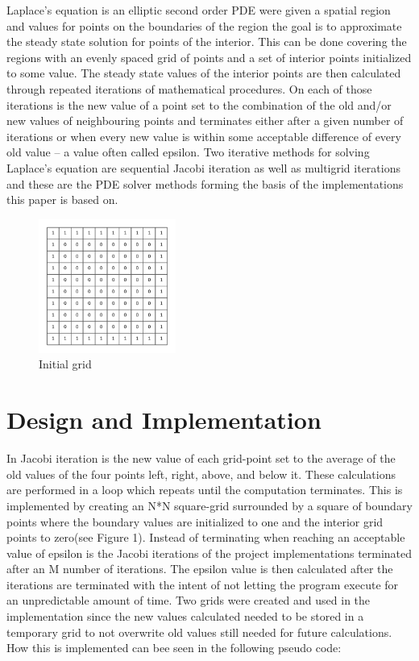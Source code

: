 \documentclass{article}
\begin{document}
Laplace’s equation is an elliptic second order PDE were given a spatial region and values for points on the boundaries of the region the goal is to approximate the steady state solution for points of the interior. This can be done covering the regions with an evenly spaced grid of points and a set of interior points initialized to some value. The steady state values of the interior points are then calculated through repeated iterations of mathematical procedures. On each of those iterations is the new value of a point set to the combination of the old and/or new values of neighbouring points and terminates either after a given number of iterations or when every new value is within some acceptable difference of every old value – a value often called epsilon. Two iterative methods for solving Laplace’s equation are sequential Jacobi iteration as well as multigrid iterations and these are the PDE solver methods forming the basis of the implementations this paper is based on. 

\begin{figure}
    \includegraphics[width=0.4\textwidth]{../images/grid.png}
    \caption{Initial grid}
    \label{grid}
\end{figure}
\newpage


\section{Design and Implementation}\label{programs}

In Jacobi iteration is the new value of each grid-point set to the average of the old values of the four points left, right, above, and below it. These calculations are performed in a loop which repeats until the computation terminates. This is implemented by creating an N*N square-grid surrounded by a square of boundary points where the boundary values are initialized to one and the interior grid points to zero(see Figure 1). Instead of terminating when reaching an acceptable value of epsilon is the Jacobi iterations of the project implementations terminated after an M number of iterations. The epsilon value is then calculated after the iterations are terminated with the intent of not letting the program execute for an unpredictable amount of time. Two grids were created and used in the implementation since the new values calculated needed to be stored in a temporary grid to not overwrite old values still needed for future calculations. How this is implemented can bee seen in the following pseudo code:
\end{document}
